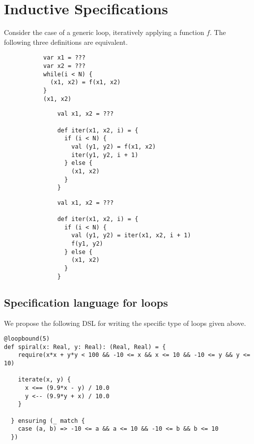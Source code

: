\section{Inductive Specifications}

Consider the case of a generic loop, iteratively applying a function $f$.
The following three definitions are equivalent.
\begin{figure}[h!]
  \centering
  \lstset{numbers=none}
  \begin{subfigure}[b]{0.25\textwidth}
    \begin{lstlisting}
var x1 = ???
var x2 = ???
while(i < N) {
  (x1, x2) = f(x1, x2)
}
(x1, x2)
    \end{lstlisting}
    \caption{}
  \end{subfigure}%
  \begin{subfigure}[b]{0.32\textwidth}
    \begin{lstlisting}
    val x1, x2 = ???

    def iter(x1, x2, i) = {
      if (i < N) {
        val (y1, y2) = f(x1, x2)
        iter(y1, y2, i + 1)
      } else {
        (x1, x2)
      }
    }
    \end{lstlisting}
    \caption{}
  \end{subfigure}
  \begin{subfigure}[b]{0.32\textwidth}
    \begin{lstlisting}
    val x1, x2 = ???

    def iter(x1, x2, i) = {
      if (i < N) {
        val (y1, y2) = iter(x1, x2, i + 1)
        f(y1, y2)
      } else {
        (x1, x2)
      }
    }
    \end{lstlisting}
    \caption{}
  \end{subfigure}
\end{figure}

\newpage
\subsection{Specification language for loops}
We propose the following DSL for writing the specific type of loops given above.
\begin{lstlisting}
@loopbound(5)
def spiral(x: Real, y: Real): (Real, Real) = {
    require(x*x + y*y < 100 && -10 <= x && x <= 10 && -10 <= y && y <= 10)

    iterate(x, y) {
      x <== (9.9*x - y) / 10.0
      y <-- (9.9*y + x) / 10.0
    }

  } ensuring (_ match {
    case (a, b) => -10 <= a && a <= 10 && -10 <= b && b <= 10
  })
\end{lstlisting}

